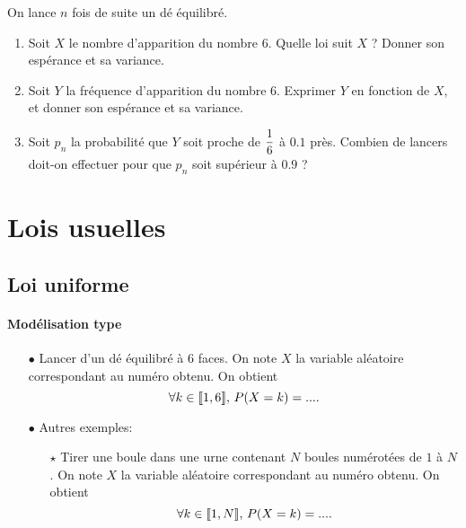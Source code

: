 \documentclass[a4paper, 11pt]{article}
\begin{document}
%
 \begin{exercice} 
On lance $n$ fois de suite un d\'e \'equilibr\'e.
\begin{enumerate}
\item Soit $X$ le nombre d'apparition du nombre $6$. Quelle loi suit $X$ ? Donner son esp\'erance et sa variance.
\item Soit $Y$ la fr\'equence d'apparition du nombre $6$. Exprimer $Y$ en fonction de $X$, et donner son esp\'erance et sa variance.
\item Soit $p_n$ la probabilit\'e que $Y$ soit proche de $\displaystyle \frac{1}{6}$ \`a $0.1$ pr\`es. Combien de lancers doit-on effectuer pour que $p_n$ soit sup\'erieur \`a $0.9$ ?
\end{enumerate}
\end{exercice}
\newpage







\section{Lois usuelles}


\subsection{Loi uniforme}



\paragraph{Mod\'elisation type}

\begin{itemize}
\item[$\bullet$] Lancer d'un dé équilibré à $6$ faces. On note $X$ la variable aléatoire correspondant au numéro obtenu. On obtient 
$$\forall k\in \llbracket 1,6\rrbracket,\,  P(X=k ) =....$$
\item[$\bullet$] Autres exemples:
\begin{itemize}
\item[$\star$]  Tirer une boule dans une urne contenant $N$  boules numérotées de $1$ à $N$. On note $X$ la variable aléatoire correspondant au numéro obtenu. On obtient 
$$\forall k\in \llbracket 1,N\rrbracket,\,  P(X=k ) =....$$
\end{itemize}
\end{itemize}
\end{document}
